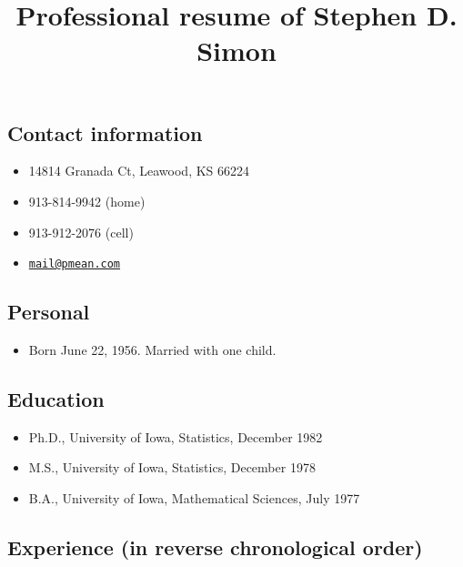 \documentclass[
  12pt,
]{article}
\title{Professional resume of Stephen D. Simon}
\author{}
\date{\vspace{-2.5em}}
\providecommand{\tightlist}{%
  \setlength{\itemsep}{0pt}\setlength{\parskip}{0pt}}
\begin{document}
\maketitle

\subsection{Contact information}\label{contact-information}

\begin{itemize}
\tightlist
\item
  14814 Granada Ct, Leawood, KS 66224
\item
  913-814-9942 (home)
\item
  913-912-2076 (cell)
\item
  \href{mailto:mail@pmean.com}{\nolinkurl{mail@pmean.com}}
\end{itemize}

\subsection{Personal}\label{personal}

\begin{itemize}
\tightlist
\item
  Born June 22, 1956. Married with one child.
\end{itemize}

\subsection{Education}\label{education}

\begin{itemize}
\tightlist
\item
  Ph.D., University of Iowa, Statistics, December 1982
\item
  M.S., University of Iowa, Statistics, December 1978
\item
  B.A., University of Iowa, Mathematical Sciences, July 1977
\end{itemize}

\subsection{Experience (in reverse chronological
order)}\label{experience-in-reverse-chronological-order}
\end{document}

